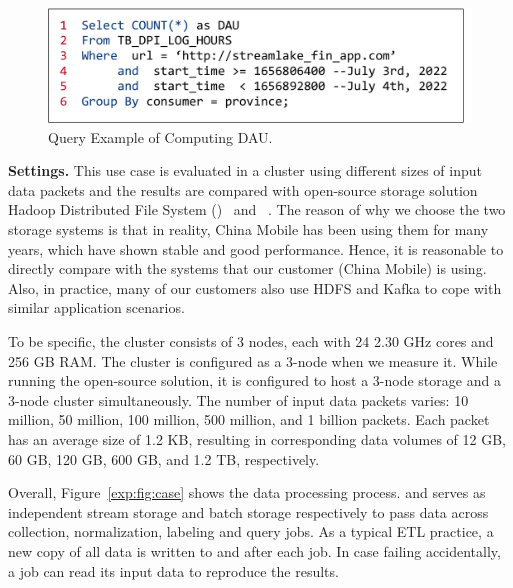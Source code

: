  \begin{figure}[htbp]
	\includegraphics[scale=0.35]{figures/sql}
	\centering
	\vspace{-1em}
	\caption{Query Example of Computing DAU.}
	\label{exp:fig:sql}
\end{figure}

\noindent \textbf{Settings.} This use case is evaluated in a  cluster using different sizes of input data packets and the results are compared with open-source storage solution Hadoop Distributed File System (\hdfs)~\cite{} and \kafka~\cite{}. The reason of why we choose the two storage systems is that in reality, China Mobile has been using them for many years, which have shown stable and good performance. Hence, it is  reasonable to directly compare with the systems that our customer (China Mobile) is using. Also, in practice, many of our customers also use HDFS and Kafka to cope with similar application scenarios.




 
  To be specific, the cluster consists of 3 nodes, each with 24  2.30 GHz cores and 256 GB RAM. The cluster is configured as a 3-node \sys when we measure it.  While running the open-source solution, it is configured to host a 3-node \hdfs storage and a 3-node \kafka cluster simultaneously. The number of input data packets varies: 10 million, 50 million, 100 million, 500 million, and 1 billion packets. Each packet has an average size of 1.2 KB, resulting in corresponding data volumes of 12 GB, 60 GB, 120 GB, 600 GB, and 1.2 TB, respectively.

Overall, Figure~\ref{exp:fig:case} shows the data processing process.  \kafka and \hdfs serves as independent stream storage and batch storage respectively to pass data across collection, normalization, labeling and query jobs.
 As a typical ETL practice, a new copy of all data is written to \hdfs and \kafka after each job. In case  failing accidentally, a job can read its input data to reproduce the results.
 
